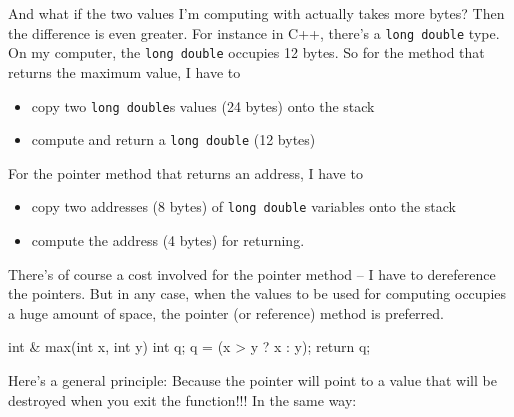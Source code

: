 And what if the two values I'm computing with actually takes more bytes?
Then the difference is even greater. For instance in C++, there's a \texttt{long double} type. On my computer, the \texttt{long double} occupies 12 bytes. So for the method that returns the maximum value, I have to

\begin{itemize}

\item
  copy two \texttt{long double}s values (24 bytes) onto the stack
\item
  compute and return a \texttt{long double} (12 bytes)
\end{itemize}

For the pointer method that returns an address, I have to

\begin{itemize}

\item
  copy two addresses (8 bytes) of \texttt{long double} variables onto the stack
\item
  compute the address (4 bytes) for returning.
\end{itemize}

There's of course a cost involved for the pointer method -- I have to dereference the pointers. But in any case, when the values to be used for computing occupies a huge amount of space, the pointer (or reference) method is preferred.


\begin{consolethree}[escapeinside=||]
int & max(int x, int y)
{
    int q;
    q = (x > y ? x : y);
    return q;
}
\end{consolethree}

Here's a general principle:  Because the pointer will point to a value that will be destroyed when you exit the function!!! In the same way: 

